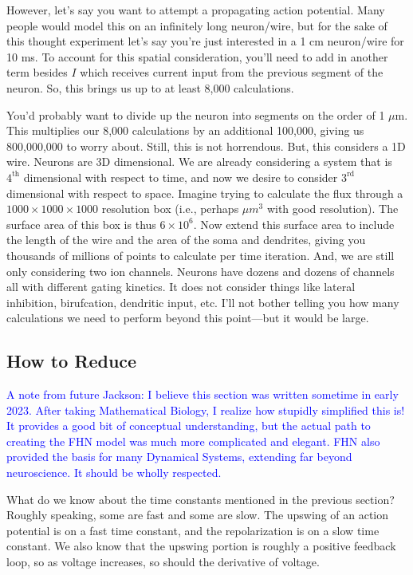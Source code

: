 However, let's say you want to attempt a propagating action potential. Many people would model this on an infinitely long neuron/wire, but for the sake of this thought experiment let's say you're just interested in a 1 cm neuron/wire for 10 ms. To account for this spatial consideration, you'll need to add in another term besides $I$ which receives current input from the previous segment of the neuron. So, this brings us up to at least 8,000 calculations.\newline

You'd probably want to divide up the neuron into segments on the order of 1 $\mu$m. This multiplies our 8,000 calculations by an additional 100,000, giving us 800,000,000 to worry about. Still, this is not horrendous. But, this considers a 1D wire. Neurons are 3D dimensional. We are already considering a system that is $4^{\mathrm{th}}$ dimensional with respect to time, and now we desire to consider $3^{\mathrm{rd}}$ dimensional with respect to space. Imagine trying to calculate the flux through a $1000 \times 1000 \times 1000$ resolution box (i.e., perhaps $\mu m^3$ with good resolution). The surface area of this box is thus $6\times 10^6$. Now extend this surface area to include the length of the wire and the area of the soma and dendrites, giving you thousands of millions of points to calculate per time iteration. And, we are still only considering two ion channels. Neurons have dozens and dozens of channels all with different gating kinetics. It does not consider things like lateral inhibition, birufcation, dendritic input, etc. I'll not bother telling you how many calculations we need to perform beyond this point---but it would be large. 

\subsection{How to Reduce} 

\textcolor{blue}{A note from future Jackson: I believe this section was written sometime in early 2023. After taking Mathematical Biology, I realize how stupidly simplified this is! It provides a good bit of conceptual understanding, but the actual path to creating the FHN model was much more complicated and elegant. FHN also provided the basis for many Dynamical Systems, extending far beyond neuroscience. It should be wholly respected.}\newline

What do we know about the time constants mentioned in the previous section? Roughly speaking, some are fast and some are slow. The upswing of an action potential is on a fast time constant, and the repolarization is on a slow time constant. We also know that the upswing portion is roughly a positive feedback loop, so as voltage increases, so should the derivative of voltage.\newline

